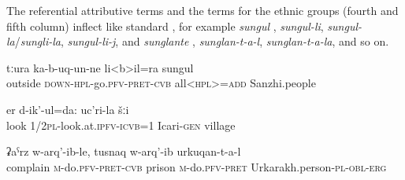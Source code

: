 The referential attributive terms and the terms for the ethnic groups (fourth and fifth column) inflect like standard , for example \textit{sungul} ,  \textit{sungul-li},  \textit{sungul-la}\slash\textit{sungli-la},  \textit{sungul-li-j}, and \textit{sunglante} ,  \textit{sunglan-t-a-l},  \textit{sunglan-t-a-la}, and so on.
%
\begin{exe}
	\ex	\label{ex:All Sanzhi people came out (of their houses)}
	\gll	tːura	ka-b-uq-un-ne	li<b>il=ra	sungul\\
		outside	\textsc{down-hpl}-go.\textsc{pfv-pret-cvb}	all<\textsc{hpl>=add}	Sanzhi.people\\
	\glt  	{}

	\ex	\label{ex:We look: the village of Icari}
	\gll	er d-ik'-ul=da:	uc'ri-la	šːi  \\
		look 1/2\textsc{pl}-look.at.\textsc{ipfv-icvb}=1	Icari-\textsc{gen}	village\\
	\glt	{}

	\ex	\label{ex:The Urkarakh people complained and put him into prison}
	\gll	ʡaˁrz	w-arq'-ib-le,	tusnaq	w-arq'-ib	urkuqan-t-a-l   \\
		complain	\textsc{m-}do.\textsc{pfv-pret-cvb}	prison	\textsc{m}-do.\textsc{pfv-pret} Urkarakh.person-\textsc{pl-obl-erg}\\
	\glt	{}
\end{exe}

